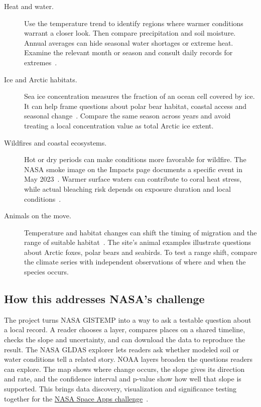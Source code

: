 \documentclass[11pt,letterpaper]{article}
\begin{document}
\begin{description}
\item[Heat and water.] Use the temperature trend to identify regions where warmer conditions warrant a closer look. Then compare precipitation and soil moisture. Annual averages can hide seasonal water shortages or extreme heat. Examine the relevant month or season and consult daily records for extremes~\cite{ipcc-extremes}.
\item[Ice and Arctic habitats.] Sea ice concentration measures the fraction of an ocean cell covered by ice. It can help frame questions about polar bear habitat, coastal access and seasonal change~\cite{ipcc-ecosystems}. Compare the same season across years and avoid treating a local concentration value as total Arctic ice extent.
\item[Wildfires and coastal ecosystems.] Hot or dry periods can make conditions more favorable for wildfire. The NASA smoke image on the Impacts page documents a specific event in May 2023~\cite{nasa-smoke}. Warmer surface waters can contribute to coral heat stress, while actual bleaching risk depends on exposure duration and local conditions~\cite{noaa-coral}.
\item[Animals on the move.] Temperature and habitat changes can shift the timing of migration and the range of suitable habitat~\cite{ipcc-ecosystems}. The site's animal examples illustrate questions about Arctic foxes, polar bears and seabirds. To test a range shift, compare the climate series with independent observations of where and when the species occurs.
\end{description}

\subsection{How this addresses NASA's challenge}
The project turns NASA GISTEMP into a way to ask a testable question about a local record. A reader chooses a layer, compares places on a shared timeline, checks the slope and uncertainty, and can download the data to reproduce the result. The NASA GLDAS explorer lets readers ask whether modeled soil or water conditions tell a related story. NOAA layers broaden the questions readers can explore. The map shows where change occurs, the slope gives its direction and rate, and the confidence interval and p-value show how well that slope is supported. This brings data discovery, visualization and significance testing together for the \href{https://www.spaceappschallenge.org/2026/challenges/earth-system-trend-detective/}{NASA Space Apps challenge}~\cite{spaceapps}.
\end{document}
